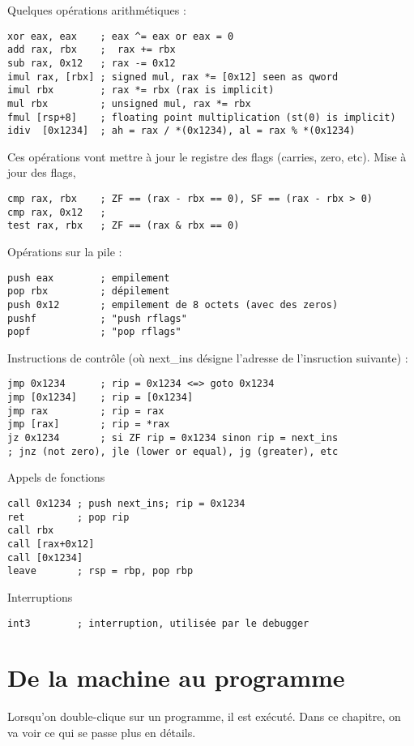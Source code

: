 \documentclass{book}
\begin{document}
{Quelques opérations arithmétiques : 
\begin{verbatim}
xor eax, eax    ; eax ^= eax or eax = 0
add rax, rbx    ;  rax += rbx
sub rax, 0x12   ; rax -= 0x12
imul rax, [rbx] ; signed mul, rax *= [0x12] seen as qword 
imul rbx        ; rax *= rbx (rax is implicit) 
mul rbx         ; unsigned mul, rax *= rbx 
fmul [rsp+8]    ; floating point multiplication (st(0) is implicit)
idiv  [0x1234]  ; ah = rax / *(0x1234), al = rax % *(0x1234)
\end{verbatim}
Ces opérations vont mettre à jour le registre des flags (carries, zero, etc). Mise à jour des flags,
\begin{verbatim}
cmp rax, rbx    ; ZF == (rax - rbx == 0), SF == (rax - rbx > 0)
cmp rax, 0x12   ; 
test rax, rbx   ; ZF == (rax & rbx == 0)
\end{verbatim}


Opérations sur la pile : 
\begin{verbatim}
push eax        ; empilement
pop rbx         ; dépilement
push 0x12       ; empilement de 8 octets (avec des zeros)
pushf           ; "push rflags"
popf            ; "pop rflags"  
\end{verbatim}

Instructions de contrôle (où next\_ins désigne l'adresse de l'insruction suivante) : 
\begin{verbatim}
jmp 0x1234      ; rip = 0x1234 <=> goto 0x1234
jmp [0x1234]    ; rip = [0x1234]
jmp rax         ; rip = rax
jmp [rax]       ; rip = *rax
jz 0x1234       ; si ZF rip = 0x1234 sinon rip = next_ins
; jnz (not zero), jle (lower or equal), jg (greater), etc
\end{verbatim}

Appels de fonctions
\begin{verbatim}
call 0x1234 ; push next_ins; rip = 0x1234
ret         ; pop rip
call rbx
call [rax+0x12]
call [0x1234]
leave       ; rsp = rbp, pop rbp
\end{verbatim}

Interruptions
\begin{verbatim}
int3        ; interruption, utilisée par le debugger
\end{verbatim}

\chapter{De la machine au programme}

Lorsqu'on double-clique sur un programme, il est exécuté. Dans ce chapitre, on va voir ce qui se passe plus en détails. 

}
\end{document}
